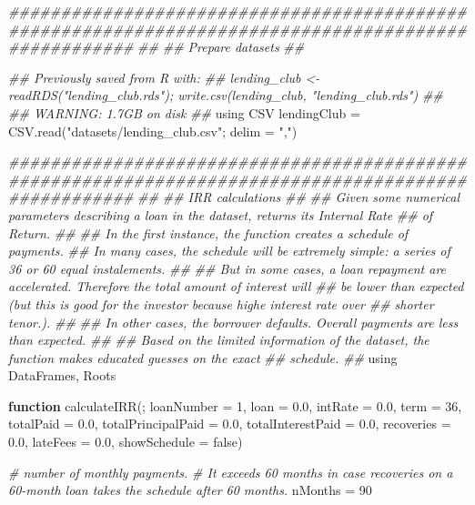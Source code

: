 \documentclass[11pt,]{report}
\newenvironment{Shaded}{\begin{snugshade}}{\end{snugshade}}
\newcommand{\CommentTok}[1]{\textcolor[rgb]{0.56,0.35,0.01}{\textit{#1}}}
\newcommand{\FloatTok}[1]{\textcolor[rgb]{0.00,0.00,0.81}{#1}}
\newcommand{\KeywordTok}[1]{\textcolor[rgb]{0.13,0.29,0.53}{\textbf{#1}}}
\newcommand{\NormalTok}[1]{#1}
\newcommand{\StringTok}[1]{\textcolor[rgb]{0.31,0.60,0.02}{#1}}
\begin{document}
\begin{Shaded}
\begin{Highlighting}[numbers=left,,]
\CommentTok{####################################################################################################}
\CommentTok{##}
\CommentTok{## Prepare datasets}
\CommentTok{##}

\CommentTok{## Previously saved from R with:}
\CommentTok{##     lending_club <- readRDS("lending_club.rds"); write.csv(lending_club, "lending_club.rds")}
\CommentTok{##}
\CommentTok{## WARNING: 1.7GB on disk}
\CommentTok{##}
\NormalTok{using CSV}
\NormalTok{lendingClub = CSV.read(}\StringTok{"datasets/lending_club.csv"}\NormalTok{; delim = }\StringTok{","}\NormalTok{)}



\CommentTok{####################################################################################################}
\CommentTok{##}
\CommentTok{## IRR calculations}
\CommentTok{##}
\CommentTok{## Given some numerical parameters describing a loan in the dataset, returns its Internal Rate}
\CommentTok{## of Return.}
\CommentTok{##}
\CommentTok{## In the first instance, the function creates a schedule of payments.}
\CommentTok{## In many cases, the schedule will be extremely simple: a series of 36 or 60 equal instalements.}
\CommentTok{##}
\CommentTok{## But in some cases, a loan repayment are accelerated. Therefore the total amount of interest will}
\CommentTok{## be lower than expected (but this is good for the investor because highe interest rate over}
\CommentTok{## shorter tenor.).}
\CommentTok{##}
\CommentTok{## In other cases, the borrower defaults. Overall payments are less than expected.}
\CommentTok{##}
\CommentTok{## Based on the limited information of the dataset, the function makes educated guesses on the exact}
\CommentTok{## schedule.}
\CommentTok{##}
\NormalTok{using DataFrames, Roots}

\KeywordTok{function}\NormalTok{ calculateIRR(; loanNumber = }\FloatTok{1}\NormalTok{, loan = }\FloatTok{0.0}\NormalTok{, intRate = }\FloatTok{0.0}\NormalTok{, term = }\FloatTok{36}\NormalTok{,}
\NormalTok{  totalPaid = }\FloatTok{0.0}\NormalTok{, totalPrincipalPaid = }\FloatTok{0.0}\NormalTok{, totalInterestPaid = }\FloatTok{0.0}\NormalTok{,}
\NormalTok{  recoveries = }\FloatTok{0.0}\NormalTok{, lateFees = }\FloatTok{0.0}\NormalTok{,}
\NormalTok{  showSchedule = false)}

  \CommentTok{# number of monthly payments.}
  \CommentTok{# It exceeds 60 months in case recoveries on a 60-month loan takes the schedule after 60 months.}
\NormalTok{  nMonths = }\FloatTok{90}


\end{Highlighting}
\end{Shaded}
\end{document}
